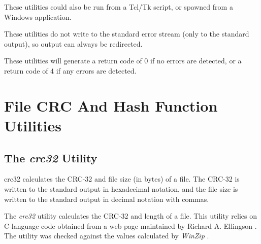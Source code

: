 These utilities could also be run from a Tcl/Tk script, or spawned from
a Windows application.

These utilities do not write to the standard error stream (only to the
standard output), so output can always be redirected.

These utilities will generate a return code of 0 if no errors are detected, or
a return code of 4 if any errors are detected.


\section{File CRC And Hash Function Utilities}
\label{cdcm0:schf0}


\subsection{The \emph{crc32} Utility}
\label{cdcm0:schf0:scrc0}

\begin{dosutilcommandname}{crc32}%
calculates the CRC-32 and file size (in bytes) of a file.
The CRC-32 is written to the standard output in hexadecimal
notation, and the file size is written to the standard output
in decimal notation with commas.
\end{dosutilcommandname}

\begin{dosutilcommandsynopsis}
\end{dosutilcommandsynopsis}

\begin{dosutilcommanddescription}
The \emph{crc32} utility calculates the CRC-32 and length of a file.
This utility relies on C-language code obtained from a web page
maintained by Richard A. Ellingson 
\cite{bibref:w:ellingsoncrc32pages}.
The utility was checked against the values calculated by 
\emph{WinZip}
\cite{bibref:s:winzip}.
\end{dosutilcommanddescription}


